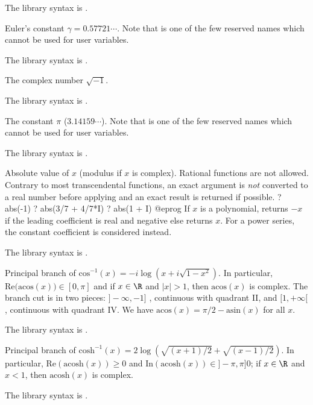 The library syntax is .

\label{se:Euler}
Euler's constant $\gamma=0.57721\cdots$. Note that
 is one of the few reserved names which cannot be used for
user variables.

The library syntax is .

\label{se:I}
The complex number $\sqrt{-1}$.

The library syntax is .

\label{se:Pi}
The constant $\pi$ ($3.14159\cdots$). Note that  is one of the few
reserved names which cannot be used for user variables.

The library syntax is .

\label{se:abs}
Absolute value of $x$ (modulus if $x$ is complex).
Rational functions are not allowed. Contrary to most transcendental
functions, an exact argument is \emph{not} converted to a real number before
applying  and an exact result is returned if possible.
\bprog
? abs(-1)
? abs(3/7 + 4/7*I)
? abs(1 + I)
@eprog\noindent
If $x$ is a polynomial, returns $-x$ if the leading coefficient is
real and negative else returns $x$. For a power series, the constant
coefficient is considered instead.

The library syntax is .

\label{se:acos}
Principal branch of $\text{cos}^{-1}(x) = -i \log (x + i\sqrt{1-x^2})$.
In particular, $\text{Re(acos}(x))\in [0,\pi]$ and if $x\in \R$ and $|x|>1$,
then $\text{acos}(x)$ is complex. The branch cut is in two pieces:
$]-\infty,-1]$ , continuous with quadrant II, and $[1,+\infty[$, continuous
with quadrant IV. We have $\text{acos}(x) = \pi/2 - \text{asin}(x)$ for all
$x$.

The library syntax is .

\label{se:acosh}
Principal branch of $\text{cosh}^{-1}(x) = 2
 \log(\sqrt{(x+1)/2} + \sqrt{(x-1)/2})$. In particular,
$\text{Re}(\text{acosh}(x))\geq 0$ and
$\text{In}(\text{acosh}(x))\in ]-\pi,\pi]0$; if $x\in \R$ and $x<1$, then
$\text{acosh}(x)$ is complex.

The library syntax is .

